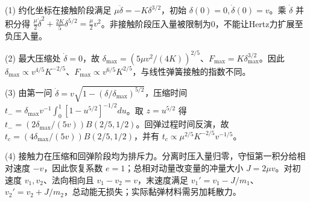 (1) 约化坐标在接触阶段满足 \(\mu\ddot\delta=-K\delta^{3/2}\)，初始 \(\delta(0)=0,\dot\delta(0)=v\)。乘 \(\dot\delta\) 并积分得 \(\boxed{\frac\mu2\dot\delta^2+\frac{2K}{5}\delta^{5/2}=\frac\mu2v^2}\)。非接触阶段压入量被限制为0，不能让Hertz力扩展至负压入量。

(2) 最大压缩处 \(\dot\delta=0\)，故 \(\boxed{\delta_{\max}=(5\mu v^2/(4K))^{2/5}}\)、\(\boxed{F_{\max}=K\delta_{\max}^{3/2}}\)。因此 \(\delta_{\max}\propto v^{4/5}K^{-2/5}\)、\(F_{\max}\propto v^{6/5}K^{2/5}\)，与线性弹簧接触的指数不同。

(3) 由第一问 \(\dot\delta=v\sqrt{1-(\delta/\delta_{\max})^{5/2}}\)，压缩时间 \(t_-=\delta_{\max}v^{-1}\int_0^1[1-u^{5/2}]^{-1/2}du\)。取 \(z=u^{5/2}\) 得 \(t_-=(2\delta_{\max}/(5v))B(2/5,1/2)\)。回弹过程时间反演，故 \(\boxed{t_c=(4\delta_{\max}/(5v))B(2/5,1/2)}\)，并有 \(t_c\propto\mu^{2/5}K^{-2/5}v^{-1/5}\)。

(4) 接触力在压缩和回弹阶段均为排斥力。分离时压入量归零，守恒第一积分给相对速度 \(-v\)，因此恢复系数 \(e=1\)；总相对动量改变量的冲量大小 \(\boxed{J=2\mu v}\)。对初速度 \(v_1,v_2\)、法向相向且 \(v_1-v_2=v\)，末速度满足 \(v_1'=v_1-J/m_1\)、\(v_2'=v_2+J/m_2\)，总动能无损失；实际黏弹材料需另加耗散力。
